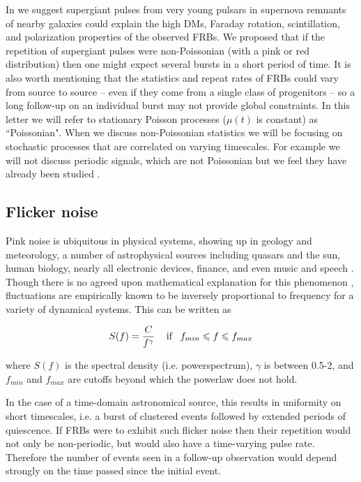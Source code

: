 \documentclass[useAMS,usenatbib]{mn2e}
\begin{document}
In \cite{2015arXiv150505535C} we 
suggest supergiant pulses from very young pulsars in supernova 
remnants of nearby galaxies could explain the high DMs, Faraday rotation, 
scintillation, and polarization properties of the observed FRBs. We  
proposed that if the repetition of supergiant pulses were non-Poissonian 
(with a pink or red distribution) 
then one might expect several bursts in a short period of time. 
It is also worth mentioning that the statistics and repeat rates of FRBs 
could vary from source to source -- even if 
they come from a single class of progenitors -- so a long follow-up on an individual burst 
may not provide global constraints.
In this 
letter we will refer to stationary Poisson processes ($\mu(t)$ is constant)
as ``Poissonian". When we discuss non-Poissonian statistics we will be
focusing on stochastic processes that are correlated on varying timescales. For
example we will not discuss periodic signals, which are not Poissonian but 
we feel they have already been studied \citep{2015MNRAS.454..457P}.


\subsection{Flicker noise}

Pink noise is ubiquitous in physical systems, showing up in 
geology and meteorology, a number 
of astrophysical sources including quasars and the sun, 
human biology, nearly all electronic devices, finance, 
and even music and speech
\citep{1978ComAp...7..103P, 1975Natur.258..317V}.
Though there is no agreed upon
mathematical explanation for this phenomenon
 \citep{2002physics...4033M}, fluctuations 
are empirically known to be inversely proportional to frequency 
for a variety of dynamical systems. This can be written as 

\begin{equation}
S(f) = \frac{C}{f^\gamma} \,\,\,\,\,\ \textup{if} \,\,\,\,\, f_{min} \le f \le f_{max}
\end{equation}

\noindent where $S(f)$ is the spectral density (i.e. powerspectrum), $\gamma$ is 
between 0.5-2,
and $f_{min}$ and $f_{max}$ are cutoffs beyond which the powerlaw 
does not hold.

In the case of a time-domain astronomical 
source, this results in uniformity on short timescales, i.e. a burst of 
clustered events followed by extended periods of quiescence. 
If FRBs were to exhibit such flicker noise then their repetition would 
not only be non-periodic, but would also have a time-varying 
pulse rate. Therefore the number of events
seen in a follow-up observation would depend strongly on 
the time passed since the initial event.
\end{document}
